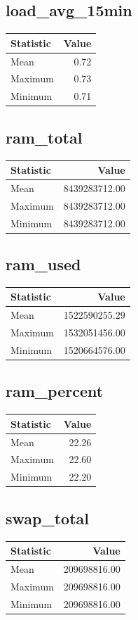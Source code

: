 \documentclass[11pt]{article}
\begin{document}
\subsection{load_avg_15min}
\begin{tabular}{lr}
\toprule
Statistic & Value \\
\midrule
Mean & 0.72 \\
Maximum & 0.73 \\
Minimum & 0.71 \\
\bottomrule
\end{tabular}


\subsection{ram_total}
\begin{tabular}{lr}
\toprule
Statistic & Value \\
\midrule
Mean & 8439283712.00 \\
Maximum & 8439283712.00 \\
Minimum & 8439283712.00 \\
\bottomrule
\end{tabular}


\subsection{ram_used}
\begin{tabular}{lr}
\toprule
Statistic & Value \\
\midrule
Mean & 1522590255.29 \\
Maximum & 1532051456.00 \\
Minimum & 1520664576.00 \\
\bottomrule
\end{tabular}


\subsection{ram_percent}
\begin{tabular}{lr}
\toprule
Statistic & Value \\
\midrule
Mean & 22.26 \\
Maximum & 22.60 \\
Minimum & 22.20 \\
\bottomrule
\end{tabular}


\subsection{swap_total}
\begin{tabular}{lr}
\toprule
Statistic & Value \\
\midrule
Mean & 209698816.00 \\
Maximum & 209698816.00 \\
Minimum & 209698816.00 \\
\bottomrule
\end{tabular}
\end{document}
